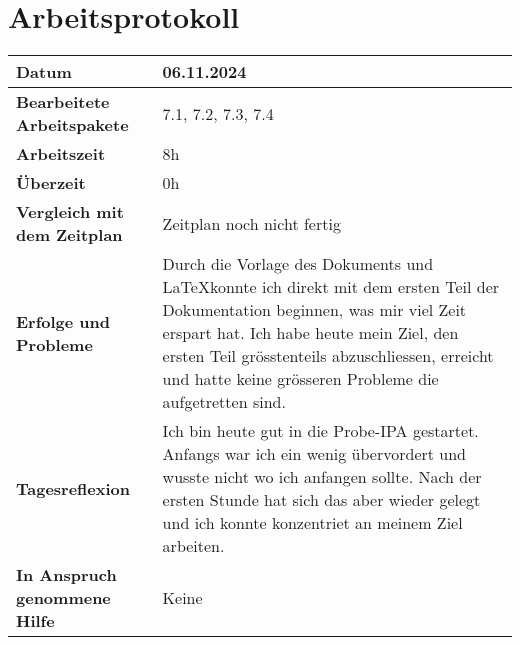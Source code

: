 \chapter{Arbeitsprotokoll}\label{ch:arbeitsprotokoll}
\renewcommand{\arraystretch}{1.5}

\begin{longtable}{p{}|p{}}
	\hline
	\textbf{Datum}                       & 06.11.2024            \\
	\hline
	\textbf{Bearbeitete Arbeitspakete}   & 7.1, 7.2, 7.3, 7.4                  \\
	\hline
	\textbf{Arbeitszeit}                 & 8h                                    \\
	\hline
	\textbf{Überzeit}                    & 0h                                    \\
	\hline
	\textbf{Vergleich mit dem Zeitplan}  & Zeitplan noch nicht fertig \\
	\hline
	\textbf{Erfolge und Probleme} & Durch die Vorlage des Dokuments und \LaTeX konnte ich direkt mit dem ersten Teil der Dokumentation beginnen, was mir viel Zeit erspart hat. Ich habe heute mein Ziel, den ersten Teil grösstenteils abzuschliessen, erreicht und hatte keine grösseren Probleme die aufgetretten sind.
	\\
	\hline
	\textbf{Tagesreflexion} & Ich bin heute gut in die Probe-IPA gestartet. Anfangs war ich ein wenig übervordert und wusste nicht wo ich anfangen sollte. Nach der ersten Stunde hat sich das aber wieder gelegt und ich konnte konzentriet an meinem Ziel arbeiten.
	\\
	\hline
	\textbf{In Anspruch genommene Hilfe} & Keine                              \\
	\hline
\end{longtable}\label{tab:arbeitsprotokoll-06.11.2024}
\newpage

